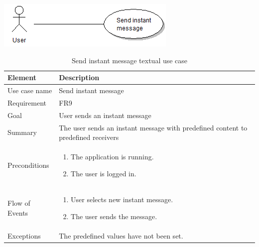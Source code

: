 \begin{table}
\begin{center}
\begin{center}
\includegraphics[width=\textwidth]{send_instant_message}
\end{center}
\begin{tabular}{p{3cm}|p{12cm}} \hline
\textbf{Element} & \textbf{Description} \\ \hline \hline
Use case name & Send instant message \\
Requirement & FR9 \\
Goal & User sends an instant message \\
Summary & The user sends an instant message with predefined content to predefined receivers \\
Preconditions &
\begin{enumerate}
\item{}The application is running.
\item{}The user is logged in.
\end{enumerate} \\ \hline
Flow of Events &
\begin{enumerate}
\item{}User selects new instant message.
\item{}The user sends the message.
\end{enumerate} \\ \hline
Exceptions & The predefined values have not been set.\\ \hline
\end{tabular}
\end{center}
\caption{Send instant message textual use case} \label{tab:createmessage}
\end{table}

